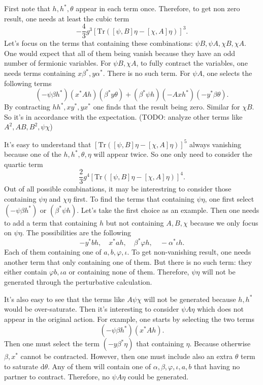 First note that $h,h^*,\theta$ appear in each term once.
Therefore, to get non zero result, one needs at least the cubic term
\[
	- \frac{4}{3} g^3 \left[\mathrm{Tr}([\psi,B]\eta - [\chi,A]\eta)\right]^3
.\] 
Let's focus on the terms that containing these combinations: $\psi B, \psi A, \chi B, \chi A$. One would expect that all of them being vanish because they have an odd number of fermionic variables. For $\psi B, \chi A$, to fully contract the variables, one needs terms containing $x\beta^*,y\alpha^*$. There is no such term. For $\psi A$, one selects the following terms
\[
	(-\psi \beta h^*)(x^* A h)(\beta^* y \theta) + (\beta^* \psi h) (- A x h^*) (- y^* \beta \theta)
.\] 
By contracting $hh^*,xy^*,yx^*$ one finds that the result being zero.
Similar for $\chi B$. So it's in accordance with the expectation.
(TODO: analyze other terms like $A^2,AB,B^2,\psi\chi$)

It's easy to understand that $\left[\mathrm{Tr}([\psi,B]\eta - [\chi,A]\eta)\right]^5$ always vanishing because one of the $h,h^*,\theta,\eta$ will appear twice. So one only need to consider the quartic term
\[
\frac{2}{3} g^4 \left[\mathrm{Tr}([\psi,B]\eta - [\chi,A]\eta)\right]^4
.\] 
Out of all possible combinations, it may be interestring to consider those containing $\psi\eta$ and $\chi\eta$ first.
To find the terms that containing $\psi\eta$, one first select $(-\psi\beta h^*)$ or $(\beta^* \psi h)$.
Let's take the first choice as an example.
Then one needs to add a term that containing $h$ but not containing $A,B,\chi$ because we only focus on $\psi\eta$.
The possibilities are the following
\[
	- y^* b h,\quad x^* a h,\quad \beta^* \varphi h,\quad -\alpha^* \iota h
.\] 
Each of them containing one of $a,b,\varphi,\iota$.
To get non-vanishing result, one needs another term that only containing one of them.
But there is no such term: they either contain $\varphi b,\iota a$ or containing none of them.
Therefore, $\psi\eta$ will not be generated through the perturbative calculation.

It's also easy to see that the terms like $A\psi\chi$ will not be generated because $h,h^*$ would be over-saturate.
Then it's interesting to consider $\psi A \eta$ which does not appear in the original action.
For example, one starts by selecting the two terms
\[
	(-\psi \beta h^*) (x^* A h)
.\] 
Then one must select the term $(- y \beta^* \eta)$ that containing $\eta$.
Because otherwise $\beta,x^*$ cannot be contracted.
However, then one must include also an extra $\theta$ term to saturate $\mathrm{d}\theta$.
Any of them will contain one of $\alpha,\beta,\varphi,\iota,a,b$ that having no partner to contract.
Therefore, no $\psi A \eta$ could be generated.

